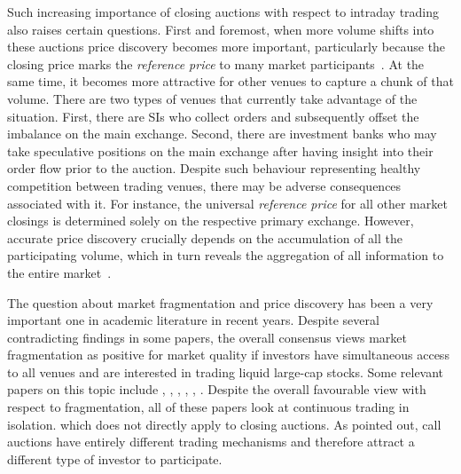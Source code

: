 \documentclass[11pt,a4paper, notitlepage]{article}
\begin{document}
	Such increasing importance of closing auctions with respect to intraday trading also raises certain questions. First and foremost, when more volume shifts into these auctions price discovery becomes more important, particularly because the closing price marks the \emph{reference price} to many market participants~\parencite{KandelRindiBosetti2012}. At the same time, it becomes more attractive for other venues to capture a chunk of that volume. There are two types of venues that currently take advantage of the situation. First, there are \acp{SI} who collect orders and subsequently offset the imbalance on the main exchange. Second, there are investment banks who may take speculative positions on the main exchange after having insight into their order flow prior to the auction. Despite such behaviour representing healthy competition between trading venues, there may be adverse consequences associated with it. For instance, the universal \emph{reference price} for all other market closings is determined solely on the respective primary exchange. However, accurate price discovery crucially depends on the accumulation of all the participating volume, which in turn reveals the aggregation of all information to the entire market~\parencite{Madhavan1992}.
	
	The question about market fragmentation and price discovery has been a very important one in academic literature in recent years. Despite several contradicting findings in some papers, the overall consensus views market fragmentation as positive for market quality if investors have simultaneous access to all venues and are interested in trading liquid large-cap stocks. Some relevant papers on this topic include \textcite{GomberSagadeTheissenWeberWestheide2017}, \textcite{HaslagRinggenberg2016}, \textcite{PaganoPengSchwartz2013}, \textcite{AitkenChenFoley2017}, \textcite{DegryseDeJongVanKervel2015}, \textcite{OharaYe2011}. Despite the overall favourable view with respect to fragmentation, all of these papers look at continuous trading in isolation. which does not directly apply to closing auctions. As \textcite{Madhavan1992} pointed out, call auctions have entirely different trading mechanisms and therefore attract a different type of investor to participate.
	
\end{document}
